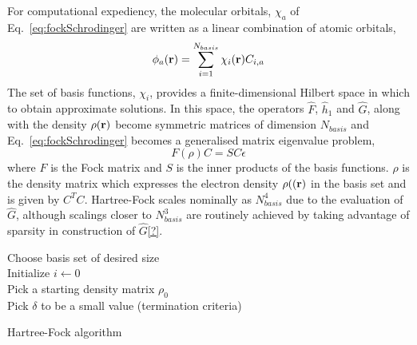 \documentclass[twoside,11pt]{article}
\begin{document}
For computational expediency, the molecular orbitals, $\chi_a$ of Eq.~\ref{eq:fockSchrodinger} are written as a linear combination of atomic orbitals,
\begin{equation}\label{eq:lcao}
\phi_a({\bf r}) = \sum_{i=1}^{N_{basis}} \chi_i({\bf r}) C_{i,a}
\end{equation}
The set of basis functions, $\chi_i$, provides a finite-dimensional Hilbert space in which to obtain approximate solutions. In this space, the operators $\hat{F}$, $\hat{h}_1$ and $\hat{G}$, along with the density $\rho({\bf r})$ become symmetric matrices of dimension $N_{basis}$ and Eq.~\ref{eq:fockSchrodinger} becomes a generalised matrix eigenvalue problem,
\begin{equation}\label{eq:fockMatrix}
F(\rho)C = SC\epsilon
\end{equation}
where $F$ is the Fock matrix and $S$ is the inner products of the basis functions. $\rho$ is the density matrix which expresses the electron density $\rho(({\bf r})$ in the basis set and is given by $C^TC$. Hartree-Fock scales nominally as $N_{basis}^4$ due to the evaluation of $\hat{G}$, although scalings closer to $N_{basis}^3$ are routinely achieved by taking advantage of sparsity in construction of $\hat{G}$\ref{?}.


\begin{algorithm}[htb]
	Choose basis set of desired size \\
	Initialize $i \leftarrow	 0$ \\	
	Pick a starting density matrix $\rho_0$ \\
	Pick $\delta$ to be a small value (termination criteria) \\
 \caption{Hartree-Fock algorithm}
\label{alg:hf}
\end{algorithm}
\end{document}
